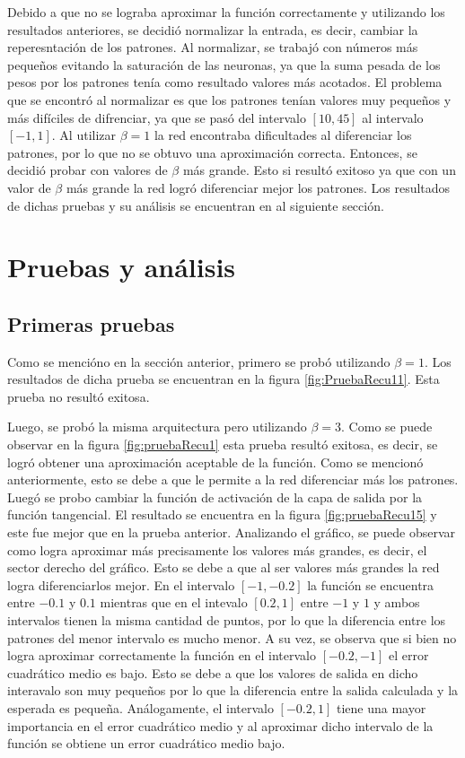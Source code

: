 \documentclass[11pt,a4paper]{article}
\begin{document}
Debido a que no se lograba aproximar la función correctamente y utilizando los resultados anteriores, se decidió normalizar la entrada, es decir, cambiar la reperesntación de los patrones. Al normalizar, se trabajó con números más pequeños evitando la saturación de las neuronas, ya que la suma pesada de los pesos por los patrones tenía como resultado valores más acotados. El problema que se encontró al normalizar es que los patrones tenían valores muy pequeños y más difíciles de difrenciar, ya que se pasó del intervalo $[10,45]$ al intervalo $[-1,1]$. Al utilizar $\beta = 1$ la red encontraba dificultades al diferenciar los patrones, por lo que no se obtuvo una aproximación correcta. Entonces, se decidió probar con valores de $\beta$ más grande. Esto si resultó exitoso ya que con un valor de $\beta$ más grande la red logró diferenciar mejor los patrones. Los resultados de dichas pruebas y su análisis se encuentran en al siguiente sección.

\section{Pruebas y análisis}
\subsection{Primeras pruebas}

Como se mencióno en la sección anterior, primero se probó utilizando $\beta = 1$. Los resultados de dicha prueba se encuentran en la figura \ref{fig:PruebaRecu11}. Esta prueba no resultó exitosa.
 
Luego, se probó la misma arquitectura pero utilizando $\beta = 3$. Como se puede observar en la figura \ref{fig:pruebaRecu1} esta prueba resultó exitosa, es decir, se logró obtener una aproximación aceptable de la función. Como se mencionó anteriormente, esto se debe a que le permite  a la red diferenciar más los patrones. Luegó se probo cambiar la función de activación de la capa de salida por la función tangencial. El resultado se encuentra en la figura \ref{fig:pruebaRecu15} y este fue mejor que en la prueba anterior. Analizando el gráfico, se puede observar como logra aproximar más precisamente los valores más grandes, es decir, el sector derecho del gráfico. Esto se debe a que al ser valores más grandes la red logra diferenciarlos mejor. En el intervalo $[-1, -0.2]$ la función se encuentra entre $-0.1$ y $0.1$ mientras que en el intevalo $[0.2, 1]$ entre $-1$ y $1$ y ambos intervalos tienen la misma cantidad de puntos, por lo que la diferencia entre los patrones del menor intervalo es mucho menor. A su vez, se observa que si bien no logra aproximar correctamente la función en  el intervalo $[- 0.2, -1]$ el error cuadrático medio es bajo. Esto se debe a que los valores de salida en dicho interavalo son muy pequeños por lo que la diferencia entre la salida calculada y la esperada es pequeña. Análogamente, el intervalo $[-0.2, 1]$ tiene una mayor importancia en el error cuadrático medio y al aproximar dicho intervalo de la función se obtiene un error cuadrático medio bajo.
\end{document}
